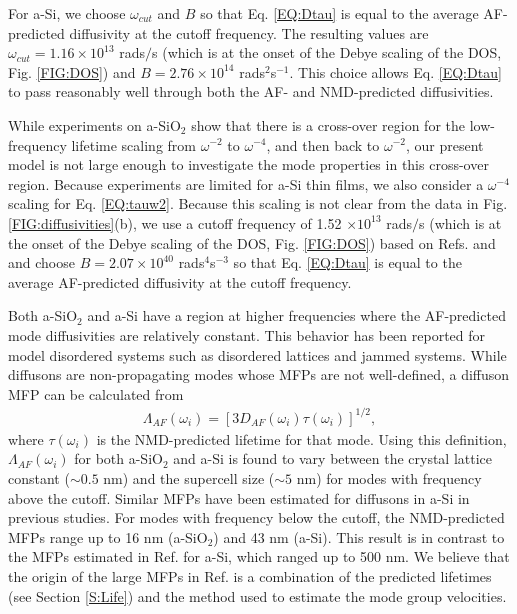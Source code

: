 \documentclass[aps,prb,twocolumn,superscriptaddress,footinbib,amsmath,amssymb,floatfix]{revtex4}
\begin{document}
For a-Si, we choose $\omega_{cut}$  
and $B$ so that Eq. \eqref{EQ:Dtau} is equal 
to the average AF-predicted diffusivity at the cutoff frequency. 
The resulting values are 
$\omega_{cut}=1.16 \times 10^{13}$ rads$/$s (which is at the onset 
of the Debye scaling of the DOS, Fig. \ref{FIG:DOS})  
and $B=2.76\times10^{14}$ rads$^2$s$^{-1}$. This choice 
allows Eq. \eqref{EQ:Dtau} to pass reasonably well through both 
the AF- and NMD-predicted diffusivities. 

While experiments on a-SiO$_2$ show that there is a cross-over 
region for the low-frequency lifetime scaling from $\omega^{-2}$ to 
$\omega^{-4}$,\cite{masciovecchio_evidence_2006} 
and then back to $\omega^{-2}$,
\cite{masciovecchio_evidence_2006,baldi_sound_2010,
baldi_elastic_2011,baldi_emergence_2013} our present model is not 
large enough to investigate the mode properties 
in this cross-over region. 
Because experiments are limited for a-Si thin films, 
\cite{hondongwa_ultrasonic_2011} 
we also consider a $\omega^{-4}$ scaling 
for Eq. \eqref{EQ:tauw2}. Because this scaling is not clear from 
the data in Fig. \ref{FIG:diffusivities}(b),  
we use a cutoff frequency of 1.52 $\times 10^{13}$ rads$/$s 
(which is at the onset 
of the Debye scaling of the DOS, Fig. \ref{FIG:DOS}) 
based on Refs.  and 
and choose $B=2.07\times10^{40}$ rads$^4$s$^{-3}$ so that 
Eq. \eqref{EQ:Dtau} is equal to the average 
AF-predicted diffusivity at the cutoff frequency. 

Both a-SiO$_2$ and a-Si have a region at higher frequencies where 
the AF-predicted mode diffusivities are relatively constant. This 
behavior has been reported for model disordered systems such as 
disordered lattices\cite{sheng_heat_1991,beltukov_ioffe-regel_2013,
larkin_predicting_2013} and jammed systems.
\cite{xu_energy_2009,vitelli_heat_2010}  
While diffusons are non-propagating modes whose MFPs are not 
well-defined,\cite{feldman_thermal_1993} 
a diffuson MFP can be calculated from 
\begin{equation}\label{EQ:LambdaAF}
\begin{split}
\Lambda_{AF}(\omega_i) = [3D_{AF}(\omega_i)\tau(\omega_i)]^{1/2},
\end{split}
\end{equation}
where $\tau(\omega_{i})$ is the NMD-predicted lifetime for that mode. 
Using this definition, $\Lambda_{AF}(\omega_i)$ for both a-SiO$_2$ 
and a-Si is found to vary between the crystal lattice constant 
($\sim 0.5$ nm) and 
the supercell size ($\sim 5$ nm) 
for modes with frequency above the cutoff. 
Similar MFPs have been estimated for diffusons in a-Si in 
previous studies.\cite{feldman_thermal_1993,feldman_numerical_1999} 
For modes with frequency below the cutoff, the NMD-predicted 
MFPs range up to 16 nm (a-SiO$_2$) 
and 43 nm (a-Si). This result is in contrast to the MFPs 
estimated in Ref.  for a-Si, which ranged 
up to 500 nm. We believe that the origin of the large MFPs 
in Ref.  is 
a combination of the predicted lifetimes (see Section \ref{S:Life}) 
and the method used to estimate the mode group velocities.
\end{document}
